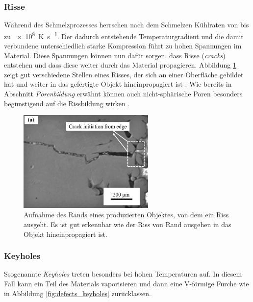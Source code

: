 		\subsubsection{Risse}
		Während des Schmelzprozesses herrschen nach dem Schmelzen Kühlraten von bis zu
		\SI{e8}{\kelvin\per\second}. Der dadurch entstehende Temperaturgradient und die damit
		verbundene unterschiedlich starke Kompression führt zu hohen Spannungen im Material.
		Diese Spannungen können nun dafür sorgen, dass Risse (\emph{cracks}) entstehen und dass
		diese weiter durch das Material propagieren. Abbildung \ref{fig:defects_cracks} zeigt gut
		verschiedene Stellen eines Risses, der sich an einer Oberfläche gebildet hat und weiter in
		das gefertigte Objekt hineinpropagiert ist \cite{zhang2017defect}. Wie bereits in
		Abschnitt \emph{Porenbildung} erwähnt können auch nicht-sphärische Poren besonders
		begünstigend auf die Rissbildung wirken \cite{galy2018main}.

		\begin{figure}[!ht]
			\centering
			\includegraphics[width=0.6\textwidth]{chapter/main/img/defects/cracks_part.png}
			\caption{Aufnahme des Rands eines produzierten Objektes, von dem ein Riss ausgeht. Es
			ist gut erkennbar wie der Riss von Rand ausgehen in das Objekt hineinpropagiert ist.
			\cite{zhang2017defect}}
			\label{fig:defects_cracks}
		\end{figure}

		\subsubsection{Keyholes}
		Ssogenannte \emph{Keyholes} treten besonders bei hohen Temperaturen auf. In diesem Fall
		kann ein Teil des Materials vaporisieren und dann eine V-förmige Furche wie in Abbildung
		\ref{fig:defects_keyholes} zurücklassen.

